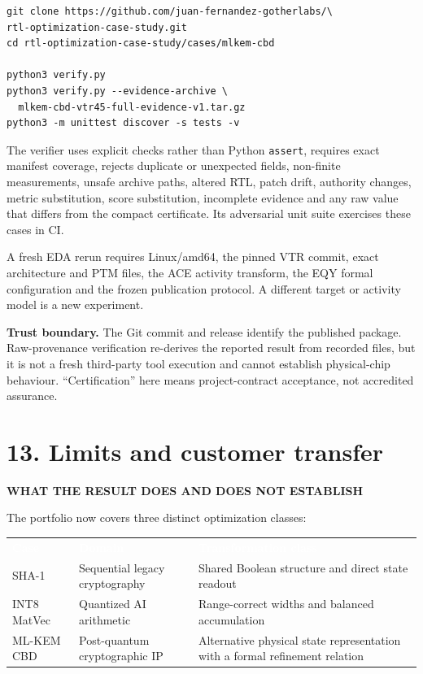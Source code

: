 \documentclass[10pt,a4paper]{article}
\newcommand{\smallcaps}[1]{\textcolor{Mid}{\fontsize{8.5}{10}\selectfont\bfseries\MakeUppercase{#1}}}
\newcommand{\newpageheading}[2]{\clearpage\section{#1}\smallcaps{#2}\vspace{6pt}}
\newcommand{\thead}[1]{\textcolor{white}{\textbf{#1}}}
\begin{document}
\begin{lstlisting}
git clone https://github.com/juan-fernandez-gotherlabs/\
rtl-optimization-case-study.git
cd rtl-optimization-case-study/cases/mlkem-cbd

python3 verify.py
python3 verify.py --evidence-archive \
  mlkem-cbd-vtr45-full-evidence-v1.tar.gz
python3 -m unittest discover -s tests -v
\end{lstlisting}

The verifier uses explicit checks rather than Python \texttt{assert}, requires exact manifest coverage, rejects duplicate or unexpected fields, non-finite measurements, unsafe archive paths, altered RTL, patch drift, authority changes, metric substitution, score substitution, incomplete evidence and any raw value that differs from the compact certificate. Its adversarial unit suite exercises these cases in CI.

A fresh EDA rerun requires Linux/amd64, the pinned VTR commit, exact architecture and PTM files, the ACE activity transform, the EQY formal configuration and the frozen publication protocol. A different target or activity model is a new experiment.

\begin{scopebox}
\textbf{Trust boundary.} The Git commit and release identify the published package. Raw-provenance verification re-derives the reported result from recorded files, but it is not a fresh third-party tool execution and cannot establish physical-chip behaviour. ``Certification'' here means project-contract acceptance, not accredited assurance.
\end{scopebox}

\newpageheading{13. Limits and customer transfer}{What the result does and does not establish}

The portfolio now covers three distinct optimization classes:

{\small
{}
\begin{tabularx}{\textwidth}{@{}B{28mm}P{40mm}Y@{}}
\rowcolor{Ink}\thead{Case} & \thead{Domain} & \thead{Transformation class} \\
SHA-1 & Sequential legacy cryptography & Shared Boolean structure and direct state readout \\
INT8 MatVec & Quantized AI arithmetic & Range-correct widths and balanced accumulation \\
ML-KEM CBD & Post-quantum cryptographic IP & Alternative physical state representation with a formal refinement relation \\
\end{tabularx}
\rowcolors{2}{}{}
}
\end{document}
